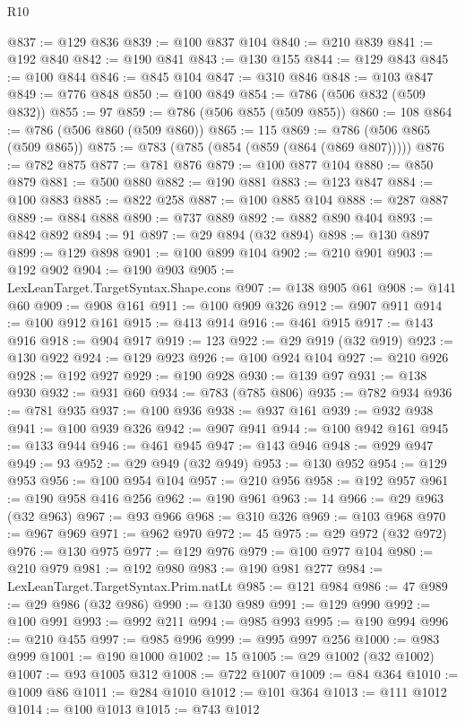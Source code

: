 \begin{lexlean}{R10}
\begin{coremodule}
@837 := @129 @836
@839 := @100 @837 @104
@840 := @210 @839
@841 := @192 @840
@842 := @190 @841
@843 := @130 @155
@844 := @129 @843
@845 := @100 @844
@846 := @845 @104
@847 := @310 @846
@848 := @103 @847
@849 := @776 @848
@850 := @100 @849
@854 := @786 (@506 @832 (@509 @832))
@855 := 97
@859 := @786 (@506 @855 (@509 @855))
@860 := 108
@864 := @786 (@506 @860 (@509 @860))
@865 := 115
@869 := @786 (@506 @865 (@509 @865))
@875 := @783 (@785 (@854 (@859 (@864 (@869 @807)))))
@876 := @782 @875
@877 := @781 @876
@879 := @100 @877 @104
@880 := @850 @879
@881 := @500 @880
@882 := @190 @881
@883 := @123 @847
@884 := @100 @883
@885 := @822 @258
@887 := @100 @885 @104
@888 := @287 @887
@889 := @884 @888
@890 := @737 @889
@892 := @882 @890 @404
@893 := @842 @892
@894 := 91
@897 := @29 @894 (@32 @894)
@898 := @130 @897
@899 := @129 @898
@901 := @100 @899 @104
@902 := @210 @901
@903 := @192 @902
@904 := @190 @903
@905 := LexLeanTarget.TargetSyntax.Shape.cons
@907 := @138 @905 @61
@908 := @141 @60
@909 := @908 @161
@911 := @100 @909 @326
@912 := @907 @911
@914 := @100 @912 @161
@915 := @413 @914
@916 := @461 @915
@917 := @143 @916
@918 := @904 @917
@919 := 123
@922 := @29 @919 (@32 @919)
@923 := @130 @922
@924 := @129 @923
@926 := @100 @924 @104
@927 := @210 @926
@928 := @192 @927
@929 := @190 @928
@930 := @139 @97
@931 := @138 @930
@932 := @931 @60
@934 := @783 (@785 @806)
@935 := @782 @934
@936 := @781 @935
@937 := @100 @936
@938 := @937 @161
@939 := @932 @938
@941 := @100 @939 @326
@942 := @907 @941
@944 := @100 @942 @161
@945 := @133 @944
@946 := @461 @945
@947 := @143 @946
@948 := @929 @947
@949 := 93
@952 := @29 @949 (@32 @949)
@953 := @130 @952
@954 := @129 @953
@956 := @100 @954 @104
@957 := @210 @956
@958 := @192 @957
@961 := @190 @958 @416 @256
@962 := @190 @961
@963 := 14
@966 := @29 @963 (@32 @963)
@967 := @93 @966
@968 := @310 @326
@969 := @103 @968
@970 := @967 @969
@971 := @962 @970
@972 := 45
@975 := @29 @972 (@32 @972)
@976 := @130 @975
@977 := @129 @976
@979 := @100 @977 @104
@980 := @210 @979
@981 := @192 @980
@983 := @190 @981 @277
@984 := LexLeanTarget.TargetSyntax.Prim.natLt
@985 := @121 @984
@986 := 47
@989 := @29 @986 (@32 @986)
@990 := @130 @989
@991 := @129 @990
@992 := @100 @991
@993 := @992 @211
@994 := @985 @993
@995 := @190 @994
@996 := @210 @455
@997 := @985 @996
@999 := @995 @997 @256
@1000 := @983 @999
@1001 := @190 @1000
@1002 := 15
@1005 := @29 @1002 (@32 @1002)
@1007 := @93 @1005 @312
@1008 := @722 @1007
@1009 := @84 @364
@1010 := @1009 @86
@1011 := @284 @1010
@1012 := @101 @364
@1013 := @111 @1012
@1014 := @100 @1013
@1015 := @743 @1012

\end{coremodule}
\end{lexlean}
